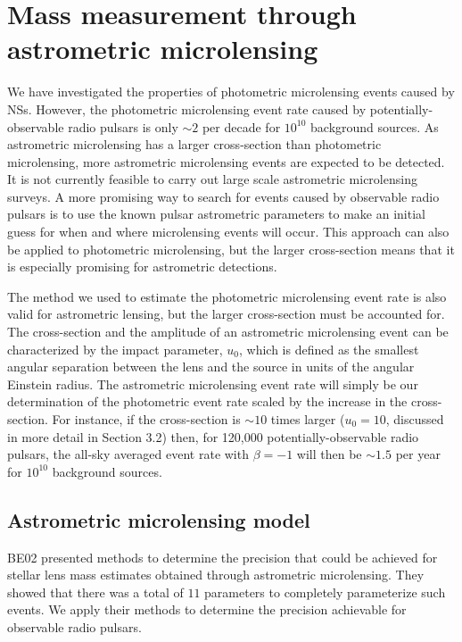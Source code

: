 \documentclass[iop,apj]{emulateapj}
\begin{document}
\section{Mass measurement through astrometric microlensing}


We have investigated the properties of photometric microlensing events caused 
by NSs. However, the photometric microlensing event rate caused by potentially-observable 
radio pulsars is only $\sim2$ per decade for $10^{10}$ background sources. As astrometric 
microlensing has a larger cross-section than photometric microlensing, more astrometric 
microlensing events are expected to be detected. It is not currently feasible to carry out 
large scale astrometric microlensing surveys. A more promising way to search for events 
caused by observable radio pulsars is to use the known pulsar astrometric parameters to 
make an initial guess for when and where microlensing events will occur.  
%
This approach can also be applied to photometric microlensing, but the larger cross-section 
means that it is especially promising for astrometric detections.

The method we used to estimate the photometric microlensing event rate is also
valid for astrometric lensing, but the larger cross-section must be accounted for.  
The cross-section and the amplitude of an astrometric microlensing event can 
be characterized by the impact parameter, $u_0$, which is defined as the 
smallest angular separation between the lens and the source in units of the 
angular Einstein radius. The astrometric microlensing event rate will simply be 
our determination of the photometric event rate scaled by the increase in the 
cross-section. For instance, if the cross-section is $\sim 10$ times larger ($u_0=10$, 
discussed in more detail in Section 3.2) then, for 120,000 potentially-observable 
radio pulsars, the all-sky averaged event rate with $\beta=-1$ will then be $\sim1.5$ 
per year for $10^{10}$ background sources.

\subsection{Astrometric microlensing model}

BE02 presented methods to determine the precision that could be
achieved for stellar lens mass estimates obtained through astrometric
microlensing. They showed that there was a total of $11$ parameters to
completely parameterize such events.
%
We apply their methods to determine the precision achievable for observable radio pulsars.
\end{document}
